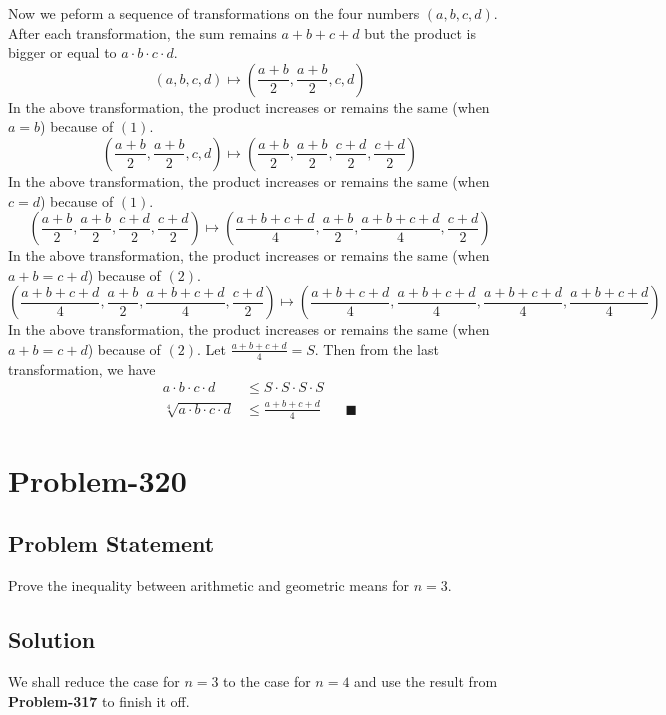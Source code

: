 \documentclass{article}
\begin{document}
Now we peform a sequence of transformations on the four numbers $(a, b, c, d)$. After each transformation, the sum remains $a+b+c+d$ but the product is bigger or equal to $a \cdot b \cdot c \cdot d$.
\[
	{(a, b, c, d) \mapsto \left(\frac{a+b}{2}, \frac{a+b}{2}, c, d \right)}
\]
In the above transformation, the product increases or remains the same (when $a = b$) because of $(1)$.
\[
	\left(\frac{a+b}{2}, \frac{a+b}{2}, c, d \right) \mapsto \left(\frac{a+b}{2}, \frac{a+b}{2}, \frac{c+d}{2}, \frac{c+d}{2} \right)
\]
In the above transformation, the product increases or remains the same (when $c = d$) because of $(1)$.
\[
	\left(\frac{a+b}{2}, \frac{a+b}{2}, \frac{c+d}{2}, \frac{c+d}{2} \right) \mapsto \left(\frac{a+b+c+d}{4}, \frac{a+b}{2}, \frac{a+b+c+d}{4}, \frac{c+d}{2} \right)
\]
In the above transformation, the product increases or remains the same (when $a+b = c+d$) because of $(2)$.
\[
	\left(\frac{a+b+c+d}{4}, \frac{a+b}{2}, \frac{a+b+c+d}{4}, \frac{c+d}{2} \right) \mapsto \left(\frac{a+b+c+d}{4}, \frac{a+b+c+d}{4}, \frac{a+b+c+d}{4}, \frac{a+b+c+d}{4} \right)
\]
In the above transformation, the product increases or remains the same (when $a+b = c+d$) because of $(2)$.
Let $\frac{a+b+c+d}{4} = S$. Then from the last transformation, we have
\begin{equation*}
	\begin{aligned}
		a \cdot b \cdot c \cdot d &\leq S \cdot S \cdot S \cdot S\\
		\sqrt[4]{a \cdot b \cdot c \cdot d} &\leq \frac{a+b+c+d}{4}\ \ \ \ \ \ \ \ \blacksquare
	\end{aligned}
\end{equation*}

\section*{Problem-320}
\subsection*{Problem Statement}
Prove the inequality between arithmetic and geometric means for $n = 3$.

\subsection*{Solution}
We shall reduce the case for $n=3$ to the case for $n=4$ and use the result from \textbf{Problem-317} to finish it off.
\\
\end{document}
